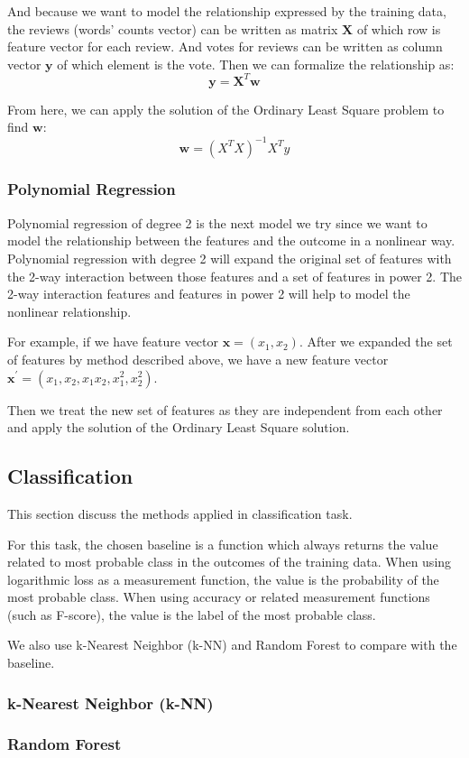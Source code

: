 And because we want to model the relationship expressed by the training data,
the reviews (words' counts vector) can be written as matrix $\mathbf{X}$ of
which row is feature vector for each review. And votes for reviews can be
written as column vector $\mathbf{y}$ of which element is the vote. Then we can
formalize the relationship as:
\[
  \mathbf{y} = \mathbf{X}^T \mathbf{w}
\]

From here, we can apply the solution of the Ordinary Least Square problem to
find $\mathbf{w}$:
\[
  \mathbf{w} = {(X^T X)}^{-1} X^T y
\]

\subsubsection{Polynomial Regression}
Polynomial regression of degree 2 is the next model we try since we want to
model the relationship between the features and the outcome in a nonlinear
way. Polynomial regression with degree 2 will expand the original set of
features with the 2-way interaction between those features and a set of features
in power 2. The 2-way interaction features and features in power 2 will help to
model the nonlinear relationship.

For example, if we have feature vector $\mathbf{x} = (x_1, x_2)$. After we
expanded the set of features by method described above, we have a new feature
vector $\mathbf{x}^{'} = (x_1, x_2, x_1x_2, x_1^2, x_2^2)$.

Then we treat the new set of features as they are independent from each other
and apply the solution of the Ordinary Least Square solution.

\subsection{Classification}
This section discuss the methods applied in classification task.

For this task, the chosen baseline is a function which always returns the value
related to most probable class in the outcomes of the training data. When using
logarithmic loss as a measurement function, the value is the probability of the
most probable class. When using accuracy or related measurement functions (such
as F-score), the value is the label of the most probable class.

We also use k-Nearest Neighbor (k-NN) and Random Forest to compare with the
baseline.

\subsubsection{k-Nearest Neighbor (k-NN)}

\subsubsection{Random Forest}

